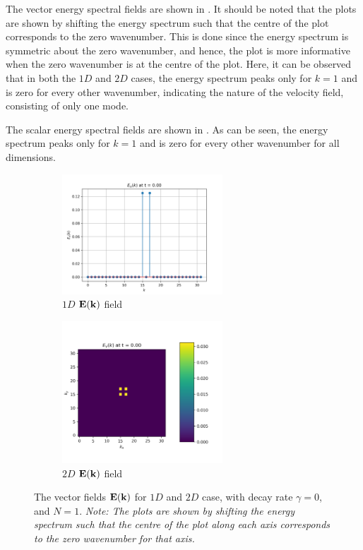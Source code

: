 The vector energy spectral fields are shown in . It should be noted that the plots are shown by shifting the energy spectrum such that the centre of the plot corresponds to the zero wavenumber. This is done since the energy spectrum is symmetric about the zero wavenumber, and hence, the plot is more informative when the zero wavenumber is at the centre of the plot. Here, it can be observed that in both the $1D$ and $2D$ cases, the energy spectrum peaks only for $k=1$ and is zero for every other wavenumber, indicating the nature of the velocity field, consisting of only one mode. 

The scalar energy spectral fields are shown in . As can be seen, the energy spectrum peaks only for $k=1$ and is zero for every other wavenumber for all dimensions.

\begin{figure}[htbp!]
    \begin{subfigure}{7cm}
      \centering\includegraphics[width=6cm]{Code-Figures/espec-simple-1d/EK_spectrum.png}
      \caption{$1D$ $\mathbf{E}(\mathbf{k})$ field}
    \end{subfigure}
    \begin{subfigure}{7cm}
      \centering\includegraphics[width=6cm]{Code-Figures/espec-simple-2d/EK_spectrum.png}
      \caption{$2D$ $\mathbf{E}(\mathbf{k})$ field}
    \end{subfigure}
    \caption{The vector fields $\mathbf{E}(\mathbf{k})$ for $1D$ and $2D$ case, with decay rate $\gamma=0$, and $N=1$. \textit{Note: The plots are shown by shifting the energy spectrum such that the centre of the plot along each axis corresponds to the zero wavenumber for that axis.}}
    \label{fig:espec-vector-fields-N1}
\end{figure}


